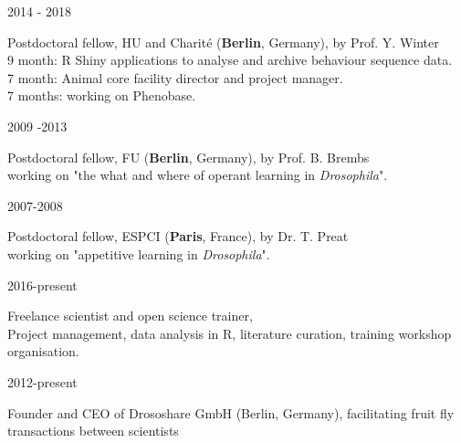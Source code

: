 %
\parbox{0.15\textwidth}{2014 - 2018}\hfill
\parbox[t]{0.83\textwidth}{Postdoctoral fellow,
       HU  and Charit\'{e} (\textbf{Berlin}, Germany),
        by Prof. Y. Winter\\
       9 month: R Shiny applications to analyse and archive behaviour sequence data.\\
      7 month: Animal core facility director and project manager.\\
       7 months: working on Phenobase.}
\parbox{0.15\textwidth}{2009 -2013}\hfill
\parbox[t]{0.83\textwidth}{Postdoctoral fellow,
       FU (\textbf{Berlin}, Germany),
        by Prof. B. Brembs\\
        working on "the what and where of operant learning in \textit{Drosophila}".}
                \parbox{0.15\textwidth}{2007-2008}\hfill
\parbox[t]{0.83\textwidth}{Postdoctoral fellow,
       ESPCI (\textbf{Paris}, France), by Dr. T. Preat\\
        working on "appetitive learning in \textit{Drosophila}".
        }


%
\parbox{0.15\textwidth}{2016-present}\hfill
\parbox[t]{0.83\textwidth}{Freelance scientist and open science trainer,\\
        Project management, data analysis in R, literature curation, training workshop organisation.}
%        
\parbox{0.15\textwidth}{2012-present}\hfill
\parbox[t]{0.83\textwidth}{Founder and CEO 
       of Drososhare GmbH (Berlin, Germany),
        facilitating fruit fly transactions between scientists}

  
%
                
